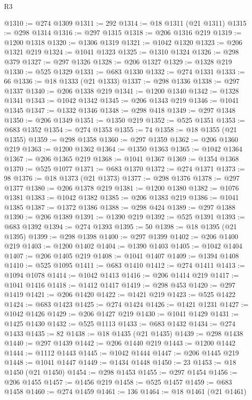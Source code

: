 \begin{lexlean}{R3}
\begin{coremodule}
@1310 := @274 @1309
@1311 := 292
@1314 := @18 @1311 (@21 @1311)
@1315 := @298 @1314
@1316 := @297 @1315
@1318 := @206 @1316 @219
@1319 := @1200 @1318
@1320 := @1306 @1319
@1321 := @1042 @1320
@1323 := @206 @1321 @219
@1324 := @1041 @1323
@1325 := @1310 @1324
@1326 := @298 @379
@1327 := @297 @1326
@1328 := @206 @1327
@1329 := @1328 @219
@1330 := @525 @1329
@1331 := @683 @1330
@1332 := @274 @1331
@1333 := 66
@1336 := @18 @1333 (@21 @1333)
@1337 := @298 @1336
@1338 := @297 @1337
@1340 := @206 @1338 @219
@1341 := @1200 @1340
@1342 := @1328 @1341
@1343 := @1042 @1342
@1345 := @206 @1343 @219
@1346 := @1041 @1345
@1347 := @1332 @1346
@1348 := @298 @418
@1349 := @297 @1348
@1350 := @206 @1349
@1351 := @1350 @219
@1352 := @525 @1351
@1353 := @683 @1352
@1354 := @274 @1353
@1355 := 74
@1358 := @18 @1355 (@21 @1355)
@1359 := @298 @1358
@1360 := @297 @1359
@1362 := @206 @1360 @219
@1363 := @1200 @1362
@1364 := @1350 @1363
@1365 := @1042 @1364
@1367 := @206 @1365 @219
@1368 := @1041 @1367
@1369 := @1354 @1368
@1370 := @525 @1077
@1371 := @683 @1370
@1372 := @274 @1371
@1373 := 98
@1376 := @18 @1373 (@21 @1373)
@1377 := @298 @1376
@1378 := @297 @1377
@1380 := @206 @1378 @219
@1381 := @1200 @1380
@1382 := @1076 @1381
@1383 := @1042 @1382
@1385 := @206 @1383 @219
@1386 := @1041 @1385
@1387 := @1372 @1386
@1388 := @298 @424
@1389 := @297 @1388
@1390 := @206 @1389
@1391 := @1390 @219
@1392 := @525 @1391
@1393 := @683 @1392
@1394 := @274 @1393
@1395 := 50
@1398 := @18 @1395 (@21 @1395)
@1399 := @298 @1398
@1400 := @297 @1399
@1402 := @206 @1400 @219
@1403 := @1200 @1402
@1404 := @1390 @1403
@1405 := @1042 @1404
@1407 := @206 @1405 @219
@1408 := @1041 @1407
@1409 := @1394 @1408
@1410 := @525 @1095
@1411 := @683 @1410
@1412 := @274 @1411
@1413 := @1094 @1078
@1414 := @1042 @1413
@1416 := @206 @1414 @219
@1417 := @1041 @1416
@1418 := @1412 @1417
@1419 := @298 @453
@1420 := @297 @1419
@1421 := @206 @1420
@1422 := @1421 @219
@1423 := @525 @1422
@1424 := @683 @1423
@1425 := @274 @1424
@1426 := @1421 @1231
@1427 := @1042 @1426
@1429 := @206 @1427 @219
@1430 := @1041 @1429
@1431 := @1425 @1430
@1432 := @525 @1113
@1433 := @683 @1432
@1434 := @274 @1433
@1435 := 82
@1438 := @18 @1435 (@21 @1435)
@1439 := @298 @1438
@1440 := @297 @1439
@1442 := @206 @1440 @219
@1443 := @1200 @1442
@1444 := @1112 @1443
@1445 := @1042 @1444
@1447 := @206 @1445 @219
@1448 := @1041 @1447
@1449 := @1434 @1448
@1450 := 23
@1453 := @18 @1450 (@21 @1450)
@1454 := @298 @1453
@1455 := @297 @1454
@1456 := @206 @1455
@1457 := @1456 @219
@1458 := @525 @1457
@1459 := @683 @1458
@1460 := @274 @1459
@1461 := 136
@1464 := @18 @1461 (@21 @1461)

\end{coremodule}
\end{lexlean}
